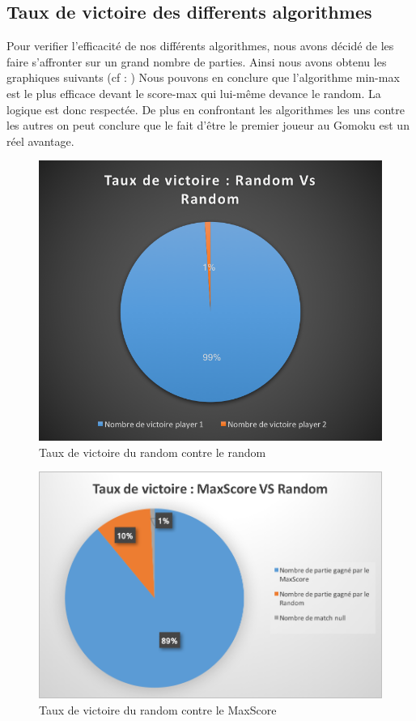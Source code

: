 \documentclass{report}
\begin{document}
	\subsection{Taux de victoire des differents algorithmes}
	Pour verifier l'efficacité de nos différents algorithmes, nous avons décidé de les faire s'affronter sur un grand nombre de parties. 
	Ainsi nous avons obtenu les graphiques suivants (cf : ) 
	Nous pouvons en conclure que l'algorithme min-max est le plus efficace devant le score-max qui lui-même devance le random. La logique est donc respectée.
	De plus en confrontant les algorithmes les uns contre les autres on peut conclure que le fait d'être le premier joueur au Gomoku est un réel avantage.
	\begin{figure}[!h]
	    \caption{Taux de victoire du random contre le random}
	    \label{TVRandomVSRandom}
	     \includegraphics[scale=0.60]{TauxDeVictoireRandomVSRandom.png}
    \end{figure}
    \begin{figure}[!h]
    	    \caption{Taux de victoire du random contre le MaxScore}
    	    \label{TVRandomVMaxScore}
    	     \includegraphics[scale=0.60]{TauxVictoireRandomVsMaxScore.png}
    \end{figure}
\end{document}
